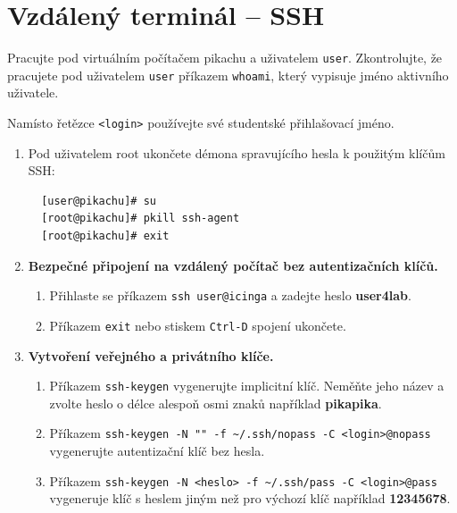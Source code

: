 \section{Vzdálený terminál -- SSH}

Pracujte pod virtuálním počítačem pikachu a uživatelem {\tt user}. Zkontrolujte, že pracujete pod
uživatelem {\tt user} příkazem {\tt whoami}, který vypisuje jméno aktivního
uživatele.

Namísto řetězce {\tt <login>} používejte své studentské přihlašovací jméno.

\begin{enumerate}

  \item Pod uživatelem root ukončete démona spravujícího hesla k použitým klíčům SSH: 
  \begin{lstlisting}
  [user@pikachu]# su
  [root@pikachu]# pkill ssh-agent
  [root@pikachu]# exit
  \end{lstlisting}

  \item {\bf Bezpečné připojení na vzdálený počítač bez autentizačních klíčů.}

    \begin{enumerate}

      \item Přihlaste se příkazem {\tt ssh user@icinga} a zadejte heslo \textbf{user4lab}.

      \item Příkazem {\tt exit} nebo stiskem {\tt Ctrl-D} spojení ukončete.

    \end{enumerate}

  \item {\bf Vytvoření veřejného a privátního klíče.}

    \begin{enumerate}

      \item Příkazem {\tt ssh-keygen} vygenerujte implicitní klíč. Neměňte jeho
        název a zvolte heslo o délce alespoň osmi znaků například \textbf{pikapika}.

      \item Příkazem \verb|ssh-keygen -N "" -f ~/.ssh/nopass -C <login>@nopass| vygenerujte autentizační klíč bez hesla.

      \item Příkazem {\tt ssh-keygen -N <heslo> -f \textasciitilde/.ssh/pass -C
        <login>@pass} vygeneruje klíč s heslem jiným než pro výchozí klíč například \textbf{12345678}.


\end{enumerate}
\end{enumerate}

